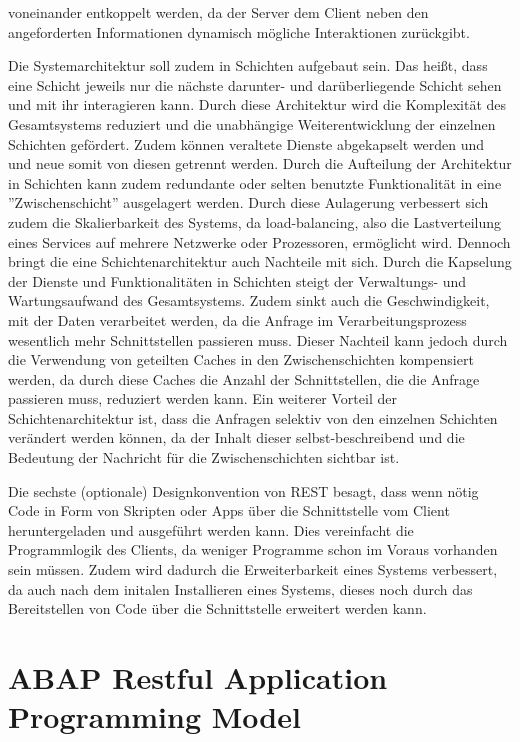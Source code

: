 voneinander entkoppelt werden, da der Server dem Client neben den angeforderten Informationen dynamisch mögliche Interaktionen zurückgibt.

Die Systemarchitektur soll zudem in Schichten aufgebaut sein. Das hei{\ss}t, dass eine Schicht jeweils nur die nächste darunter- und darüberliegende Schicht sehen und mit ihr interagieren kann. Durch diese Architektur wird die Komplexität des Gesamtsystems reduziert und die unabhängige Weiterentwicklung der einzelnen Schichten gefördert. Zudem können veraltete Dienste abgekapselt werden und und neue somit von diesen getrennt werden. Durch die Aufteilung der Architektur in Schichten kann zudem redundante oder selten benutzte Funktionalität in eine ''Zwischenschicht'' ausgelagert werden. Durch diese Aulagerung verbessert sich zudem die Skalierbarkeit des Systems, da load-balancing, also die Lastverteilung eines Services auf mehrere Netzwerke oder Prozessoren, ermöglicht wird. Dennoch bringt die eine Schichtenarchitektur auch Nachteile mit sich. Durch die Kapselung der Dienste und Funktionalitäten in Schichten steigt der Verwaltungs- und Wartungsaufwand des Gesamtsystems. Zudem sinkt auch die Geschwindigkeit, mit der Daten verarbeitet werden, da die Anfrage im Verarbeitungsprozess wesentlich mehr Schnittstellen passieren muss. Dieser Nachteil kann jedoch durch die Verwendung von geteilten Caches in den Zwischenschichten kompensiert werden, da durch diese Caches die Anzahl der Schnittstellen, die die Anfrage passieren muss, reduziert werden kann. Ein weiterer Vorteil der Schichtenarchitektur ist, dass die Anfragen selektiv von den einzelnen Schichten verändert werden können, da der Inhalt dieser selbst-beschreibend und die Bedeutung der Nachricht für die Zwischenschichten sichtbar ist.

Die sechste (optionale) Designkonvention von REST besagt, dass wenn nötig Code in Form von Skripten oder Apps über die Schnittstelle vom Client heruntergeladen und ausgeführt werden kann. Dies vereinfacht die Programmlogik des Clients, da weniger Programme schon im Voraus vorhanden sein müssen. Zudem wird dadurch die Erweiterbarkeit eines Systems verbessert, da auch nach dem initalen Installieren eines Systems, dieses noch durch das Bereitstellen von Code über die Schnittstelle erweitert werden kann.

\section{ABAP Restful Application Programming Model}

